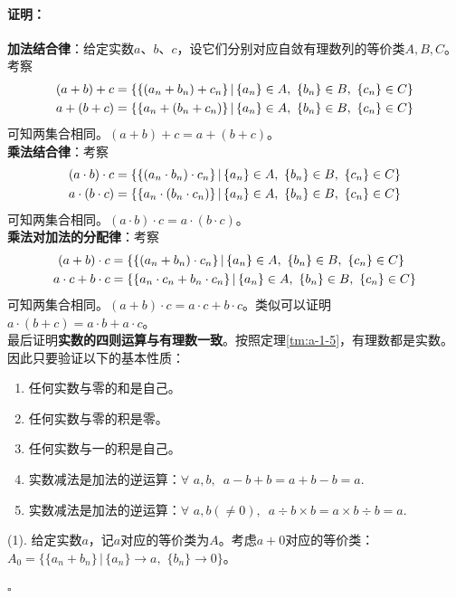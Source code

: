 \documentclass[12pt,UTF8]{ctexbook}
\renewenvironment{proof}{\paragraph{\textbf{证明：}}}{\hfill$\square$}
\begin{document}
\begin{appendix}
\begin{proof}
    \textbf{加法结合律}：给定实数$a$、$b$、$c$，设它们分别对应自敛有理数列的等价类$A,B,C$。考察
    \begin{align}
        (a + b) + c &= \{\{(a_n + b_n) + c_n\} \, |\, \{a_n\}\in A,\,\,\{b_n\}\in B,\,\,\{c_n\}\in C \} \notag \\
        a + (b + c) &= \{\{a_n + (b_n + c_n)\} \, |\, \{a_n\}\in A,\,\,\{b_n\}\in B,\,\,\{c_n\}\in C \} \notag
    \end{align}
    可知两集合相同。$(a + b) + c = a + (b + c)$。\\
    \textbf{乘法结合律}：考察
    \begin{align}
        (a \cdot b) \cdot c &= \{\{(a_n \cdot b_n) \cdot c_n\} \, |\, \{a_n\}\in A,\,\,\{b_n\}\in B,\,\,\{c_n\}\in C \} \notag \\
        a \cdot (b \cdot c) &= \{\{a_n \cdot (b_n \cdot c_n)\} \, |\, \{a_n\}\in A,\,\,\{b_n\}\in B,\,\,\{c_n\}\in C \} \notag
    \end{align}
    可知两集合相同。$(a \cdot b) \cdot c = a \cdot (b \cdot c)$。\\
    \textbf{乘法对加法的分配律}：考察
    \begin{align}
        (a + b) \cdot c &= \{\{(a_n + b_n) \cdot c_n\} \, |\, \{a_n\}\in A,\,\,\{b_n\}\in B,\,\,\{c_n\}\in C \} \notag \\
        a \cdot c + b \cdot c &= \{\{a_n \cdot c_n + b_n \cdot c_n\} \, |\, \{a_n\}\in A,\,\,\{b_n\}\in B,\,\,\{c_n\}\in C \} \notag
    \end{align}
    可知两集合相同。$(a + b) \cdot c = a \cdot c + b \cdot c$。类似可以证明$a \cdot (b + c) = a \cdot b + a \cdot c$。\\
    最后证明\textbf{实数的四则运算与有理数一致}。按照定理\ref{tm:a-1-5}，有理数都是实数。因此只要验证以下的基本性质：
    \begin{enumerate}
        \item 任何实数与零的和是自己。
        \item 任何实数与零的积是零。
        \item 任何实数与一的积是自己。
        \item 实数减法是加法的逆运算：$\forall \,\, a, b, \,\,\, a - b + b = a + b - b = a.$
        \item 实数减法是加法的逆运算：$\forall \,\, a, b(\neq 0), \,\,\, a \div b \times b = a\times b \div b = a.$
    \end{enumerate}
    (1). 给定实数$a$，记$a$对应的等价类为$A$。考虑$a+0$对应的等价类：$A_0 = \{ \{a_n + b_n\} \,|\, \{a_n\}\to a, \,\, \{b_n\} \to 0 \}$。

\end{proof}
\end{appendix}
\end{document}
